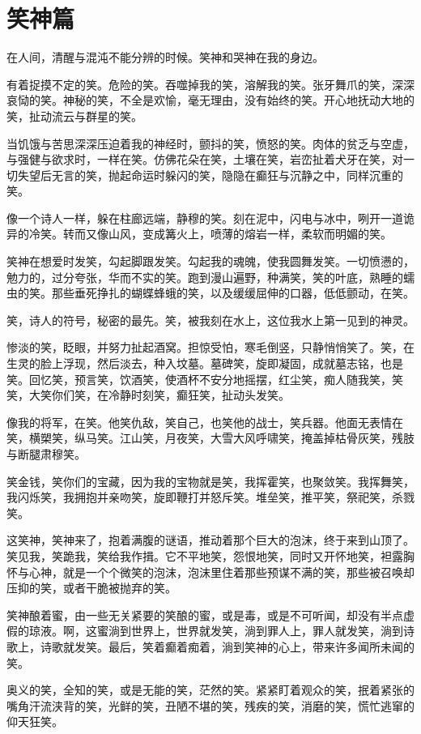\documentclass[UTF8]{article}
\begin{document}
\section{笑神篇}
\par 在人间，清醒与混沌不能分辨的时候。笑神和哭神在我的身边。
\par 有着捉摸不定的笑。危险的笑。吞噬掉我的笑，溶解我的笑。张牙舞爪的笑，深深哀恸的笑。神秘的笑，不全是欢愉，毫无理由，没有始终的笑。开心地抚动大地的笑，扯动流云与群星的笑。
\par 当饥饿与苦思深深压迫着我的神经时，颤抖的笑，愤怒的笑。肉体的贫乏与空虚，与强健与欲求时，一样在笑。仿佛花朵在笑，土壤在笑，岩峦扯着犬牙在笑，对一切失望后无言的笑，抛起命运时躲闪的笑，隐隐在癫狂与沉静之中，同样沉重的笑。
\par 像一个诗人一样，躲在柱廊远端，静穆的笑。刻在泥中，闪电与冰中，咧开一道诡异的冷笑。转而又像山风，变成篝火上，喷薄的熔岩一样，柔软而明媚的笑。
\par 笑神在想爱时发笑，勾起脚跟发笑。勾起我的魂魄，使我圆舞发笑。一切愤懑的，勉力的，过分夸张，华而不实的笑。跑到漫山遍野，种满笑，笑的叶底，熟睡的蠕虫的笑。那些垂死挣扎的蝴蝶蜂蛾的笑，以及缓缓屈伸的口器，低低颤动，在笑。
\par 笑，诗人的符号，秘密的最先。笑，被我刻在水上，这位我水上第一见到的神灵。
\par 惨淡的笑，眨眼，并努力扯起酒窝。担惊受怕，寒毛倒竖，只静悄悄笑了。笑，在生灵的脸上浮现，然后淡去，种入坟墓。墓碑笑，旋即凝固，成就墓志铭，也是笑。回忆笑，预言笑，饮酒笑，使酒杯不安分地摇摆，红尘笑，痴人随我笑，笑笑，大笑你们笑，在冷静时刻笑，癫狂笑，扯动头发笑。
\par 像我的将军，在笑。他笑仇敌，笑自己，也笑他的战士，笑兵器。他面无表情在笑，横槊笑，纵马笑。江山笑，月夜笑，大雪大风呼啸笑，掩盖掉枯骨灰笑，残肢与断腿肃穆笑。
\par 笑金钱，笑你们的宝藏，因为我的宝物就是笑，我挥霍笑，也聚敛笑。我挥舞笑，我闪烁笑，我拥抱并亲吻笑，旋即鞭打并怒斥笑。堆垒笑，推平笑，祭祀笑，杀戮笑。
\par 这笑神，笑神来了，抱着满腹的谜语，推动着那个巨大的泡沫，终于来到山顶了。笑见我，笑跪我，笑给我作揖。它不平地笑，怨恨地笑，同时又开怀地笑，袒露胸怀与心神，就是一个个微笑的泡沫，泡沫里住着那些预谋不满的笑，那些被召唤却压抑的笑，或者干脆被抛弃的笑。
\par 笑神酿着蜜，由一些无关紧要的笑酿的蜜，或是毒，或是不可听闻，却没有半点虚假的琼液。啊，这蜜淌到世界上，世界就发笑，淌到罪人上，罪人就发笑，淌到诗歌上，诗歌就发笑。最后，笑着癫着痴着，淌到笑神的心上，带来许多闻所未闻的笑。
\par 奥义的笑，全知的笑，或是无能的笑，茫然的笑。紧紧盯着观众的笑，抿着紧张的嘴角汗流浃背的笑，光鲜的笑，丑陋不堪的笑，残疾的笑，消磨的笑，慌忙逃窜的仰天狂笑。
\end{document}
